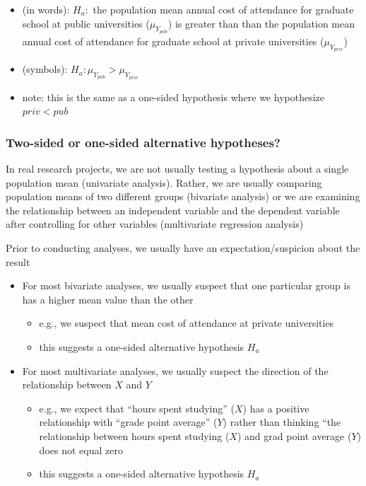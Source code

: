 \documentclass[
  letterpaper,
  DIV=11,
  numbers=noendperiod]{scrartcl}
\providecommand{\tightlist}{%
  \setlength{\itemsep}{0pt}\setlength{\parskip}{0pt}}\usepackage{longtable,booktabs,array}
\begin{document}
\begin{itemize}
  \begin{itemize}
  \tightlist
  \item
    (in words): \(H_a:\) the population mean annual cost of attendance
    for graduate school at public universities (\(\mu_{Y_{{pub}}}\)) is
    greater than than the population mean annual cost of attendance for
    graduate school at private universities (\(\mu_{Y_{{priv}}}\))
  \item
    (symbols): \(H_a: \mu_{Y_{{pub}}} > \mu_{Y_{{priv}}}\)
  \item
    note: this is the same as a one-sided hypothesis where we
    hypothesize \(priv < pub\)
  \end{itemize}
\end{itemize}

\subsubsection{Two-sided or one-sided alternative
hypotheses?}\label{two-sided-or-one-sided-alternative-hypotheses}

In real research projects, we are not usually testing a hypothesis about
a single population mean (univariate analysis). Rather, we are usually
comparing population means of two different groups (bivariate analysis)
or we are examining the relationship between an independent variable and
the dependent variable after controlling for other variables
(multivariate regression analysis)

Prior to conducting analyses, we usually have an expectation/suspicion
about the result

\begin{itemize}
\tightlist
\item
  For most bivariate analyses, we usually suspect that one particular
  group is has a higher mean value than the other

  \begin{itemize}
  \tightlist
  \item
    e.g., we suspect that mean cost of attendance at private
    universities
  \item
    this suggests a one-sided alternative hypothesis \(H_a\)
  \end{itemize}
\item
  For most multivariate analyses, we usually suspect the direction of
  the relationship between \(X\) and \(Y\)

  \begin{itemize}
  \tightlist
  \item
    e.g., we expect that ``hours spent studying'' (\(X\)) has a positive
    relationship with ``grade point average'' (\(Y\)) rather than
    thinking ``the relationship between hours spent studying (\(X\)) and
    grad point average (\(Y\)) does not equal zero
  \item
    this suggests a one-sided alternative hypothesis \(H_a\)
  \end{itemize}
\end{itemize}
\end{document}
